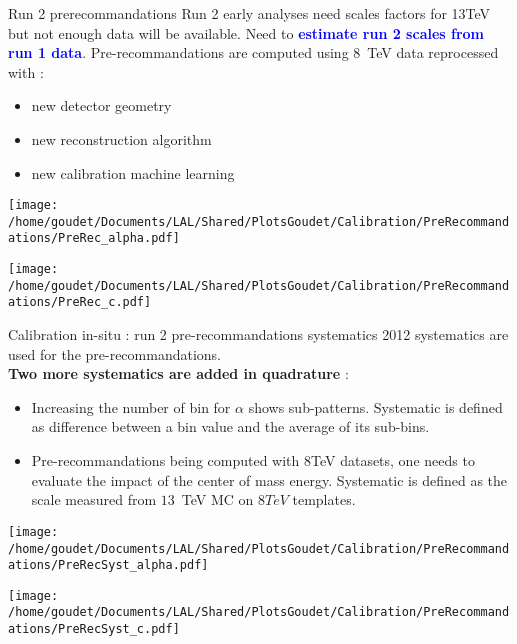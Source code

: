 \begin{frame}{Run 2 prerecommandations}
Run 2 early analyses need scales factors for 13TeV but not enough data will be available.
Need to \textcolor{blue}{ \bf estimate run 2 scales from run 1 data}.
\newline
Pre-recommandations are computed using $8$~TeV data reprocessed with :
\begin{itemize}
\item new detector geometry
\item new reconstruction algorithm
\item new calibration machine learning
\end{itemize} 
  \begin{minipage}{0.49\linewidth}
    \texttt{[image: /home/goudet/Documents/LAL/Shared/PlotsGoudet/Calibration/PreRecommandations/PreRec\_alpha.pdf]}
  \end{minipage}
  \begin{minipage}{0.49\linewidth}
    \texttt{[image: /home/goudet/Documents/LAL/Shared/PlotsGoudet/Calibration/PreRecommandations/PreRec\_c.pdf]}
  \end{minipage}
\end{frame}


\begin{frame}{Calibration in-situ : run 2 pre-recommandations systematics}
2012 systematics are used for the pre-recommandations. \\
{\bf Two more systematics are added in quadrature } :
\begin{itemize}
\item Increasing the number of bin for $\alpha$ shows sub-patterns. 
  Systematic is defined as difference between a bin value and the average of its sub-bins.
\item Pre-recommandations being computed with 8TeV datasets, one needs to evaluate the impact of the center of mass energy.
Systematic is defined as the scale measured from $13$~TeV MC on $8TeV$ templates.
\end{itemize}
  \begin{minipage}{0.49\linewidth}
    \texttt{[image: /home/goudet/Documents/LAL/Shared/PlotsGoudet/Calibration/PreRecommandations/PreRecSyst\_alpha.pdf]}
  \end{minipage}
  \hfill
  \begin{minipage}{0.49\linewidth}
    \texttt{[image: /home/goudet/Documents/LAL/Shared/PlotsGoudet/Calibration/PreRecommandations/PreRecSyst\_c.pdf]}
  \end{minipage}\\
\end{frame}

